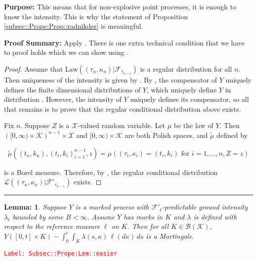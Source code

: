 \documentclass[12pt]{article}
\newcommand{\mc}{\mathcal}
\newcommand{\ms}{\mathscr}
\newcommand{\te}{\text}
\newcommand{\tr}{\textcolor{red}}
\newcommand{\labe}[1]{\tr{\texttt{Label: #1}}}
\newcommand{\purpose}{\textbf{Purpose: }}
\newcommand{\pfsum}{\textbf{Proof Summary: }}
\newcommand{\ind}{\hspace{24pt}}
\newcommand{\lin}{\rule{\linewidth}{0.4 pt}}
\newcommand{\law}{\te{Law}}							%
\newtheorem{lem}[thms]{Lemma: }
\begin{document}
\purpose This means that for non-explosive point processes, it is enough to know the intensity. This is why the statement of Proposition \ref{subsec::Prope:Prop::radnikder} is meaningful.

\pfsum Apply \cite[Propositions 14.3.II(b),14.2.IV(c) and 9.2.III]{DalVer08}. There is one extra technical condition that we have to proof holds which we can show using \cite[Proposition A1.5.III]{DalVer03}.

\begin{proof}
Assume that \(\law((\tau_n,\kappa_n)|\mc{F}_{\tau_{n-1}})\) is a regular distribution for all \(n\). Then uniqueness of the intensity is given by \cite[Proposition 14.3.II (b)]{DalVer08}. By \cite[Proposition 14.2.IV (c)]{DalVer08}, the compensator of \(Y\) uniquely defines the finite dimensional distributions of \(Y\), which uniquely define \(Y\) in distribution \cite[Proposition 9.2.III]{DalVer08}. However, the intensity of \(Y\) uniquely defines its compensator, so all that remains is to prove that the regular conditional distribution above exists.

\ind Fix \(n\). Suppose \(Z\) is a \(\mc{X}\)-valued random variable. Let \(\mu\) be the law of \(Y\). Then \(\left([0,\infty)\times \mc{K}\right)^{n-1}\times\mc{X}\) and \([0,\infty)\times \mc{K}\) are both Polish spaces, and \(\tilde{\mu}\) defined by 

\[\tilde{\mu}((t_n,k_n),(t_i,k_i)_{i=1}^{n-1},z) = \mu\left((\tau_i,\kappa_i) = (t_i,k_i)\te{ for } i=1,\dots,n, Z = z\right)\]

is a Borel measure. Therefore, by \cite[Proposition A1.5.III]{DalVer03}, the regular conditional distribution \(\ms{L}((\tau_n,\kappa_n)|\mc{F}'_{\tau_{n-1}})\) exists.
\end{proof}


\lin

\begin{lem}
Suppose \(Y\) is a marked process with \(\mc{F}'_t\)-predictable ground intensity \(\lambda_t\) bounded by some \(B < \infty\). Assume \(Y\) has marks in \(K\) and \(\lambda\) is defined with respect to the reference measure \(\ell\) on \(K\). Then for all \(K \in \ms{B}(\mc{K})\), \(Y([0,t]\times K) - \int_0^t\int_K \lambda(s,\kappa)\,\ell(d\kappa)\,ds\) is a Martingale.
\label{Subsec::Prope:Lem::easier}
\end{lem}
\labe{Subsec::Prope:Lem::easier}
\end{document}
